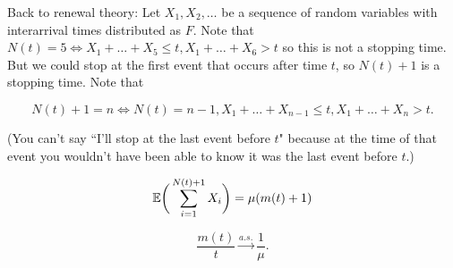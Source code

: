 Back to renewal theory: Let \(X_1, X_2, \ldots\) be a sequence of random variables with interarrival times distributed as \(F\). Note that \(N(t) = 5 \iff X_1 + \ldots + X_5 \leq t, X_1 + \ldots + X_6 > t\) so this is not a stopping time. But we could stop at the first event that occurs after time \(t\), so \(N(t)+1\) is a stopping time. Note that 

\[
N(t) + 1 = n \iff N(t) = n - 1, X_1 + \ldots + X_{n-1} \leq t, X_1 + \ldots + X_n > t.
\]

(You can't say ``I'll stop at the last event before \(t\)" because at the time of that event you wouldn't have been able to know it was the last event before \(t\).)

\begin{corollary}\label{stoch.wald.eqn.cor}

\[
\mathbb{E} \bigg( \sum_{i=1}^{N(t) + 1} X_i \bigg) = \mu(m(t) +1)
\]

\end{corollary}

\begin{theorem}\label{stoch.elem.renew.thm}

\[
\frac{m(t)}{t} \xrightarrow{a.s.} \frac{1}{\mu}.
\]

\end{theorem}

